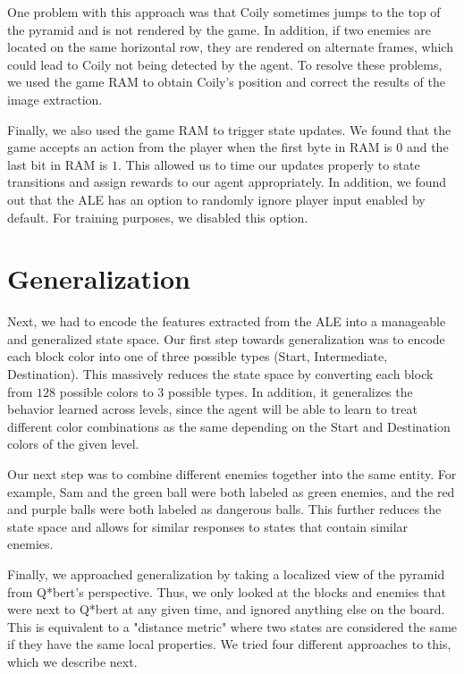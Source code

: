 \documentclass[journal,hidelinks]{IEEEtran}
\begin{document}
One problem with this approach was that Coily sometimes jumps to the top of the pyramid and is not rendered by the game. In addition, if two enemies are located on the same horizontal row, they are rendered on alternate frames, which could lead to Coily not being detected by the agent. To resolve these problems, we used the game RAM to obtain Coily's position and correct the results of the image extraction.

Finally, we also used the game RAM to trigger state updates. We found that the game accepts an action from the player when the first byte in RAM is $0$ and the last bit in RAM is $1$. This allowed us to time our updates properly to state transitions and assign rewards to our agent appropriately. In addition, we found out that the ALE has an option to randomly ignore player input enabled by default. For training purposes, we disabled this option.

\section{Generalization}

Next, we had to encode the features extracted from the ALE into a manageable and generalized state space. Our first step towards generalization was to encode each block color into one of three possible types (Start, Intermediate, Destination). This massively reduces the state space by converting each block from $128$ possible colors to $3$ possible types. In addition, it generalizes the behavior learned across levels, since the agent will be able to learn to treat different color combinations as the same depending on the Start and Destination colors of the given level.

Our next step was to combine different enemies together into the same entity. For example, Sam and the green ball were both labeled as green enemies, and the red and purple balls were both labeled as dangerous balls. This further reduces the state space and allows for similar responses to states that contain similar enemies.

Finally, we approached generalization by taking a localized view of the pyramid from Q*bert's perspective. Thus, we only looked at the blocks and enemies that were next to Q*bert at any given time, and ignored anything else on the board. This is equivalent to a "distance metric" where two states are considered the same if they have the same local properties. We tried four different approaches to this, which we describe next.
\end{document}
